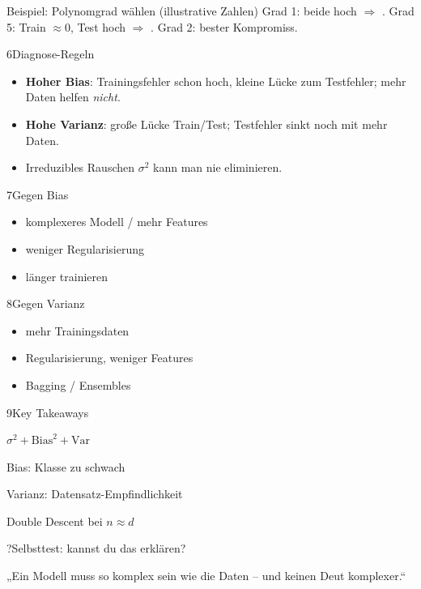 \begin{hngrid}
\begin{hnex}[raster multicolumn=3]{Beispiel: Polynomgrad wählen (illustrative Zahlen)}
Grad 1: beide hoch $\Rightarrow$ . Grad 5: Train $\approx0$, Test hoch $\Rightarrow$ . Grad 2: bester Kompromiss.
\end{hnex}
%
\begin{hnp}[raster multicolumn=3,acc=hnrose]{6}{Diagnose-Regeln}
\begin{itemize}
\item \textbf{Hoher Bias}: Trainingsfehler schon hoch, kleine Lücke zum Testfehler; mehr Daten helfen \emph{nicht}.
\item \textbf{Hohe Varianz}: große Lücke Train/Test; Testfehler sinkt noch mit mehr Daten.
\item Irreduzibles Rauschen $\sigma^2$ kann man nie eliminieren.
\end{itemize}
\end{hnp}
%
\begin{hnp}[raster multicolumn=2,acc=hnred]{7}{Gegen Bias}
\begin{itemize}
\item komplexeres Modell / mehr Features
\item weniger Regularisierung
\item länger trainieren
\end{itemize}
\end{hnp}
%
\begin{hnp}[raster multicolumn=2,acc=hngreen]{8}{Gegen Varianz}
\begin{itemize}
\item mehr Trainingsdaten
\item Regularisierung, weniger Features
\item Bagging / Ensembles
\end{itemize}
\end{hnp}
%
\begin{hnp}[raster multicolumn=2,acc=hnorange]{9}{Key Takeaways}
\begin{hnchk}
\item $\sigma^2+\mathrm{Bias}^2+\mathrm{Var}$
\item Bias: Klasse zu schwach
\item Varianz: Datensatz-Empfindlichkeit
\item Double Descent bei $n\approx d$
\end{hnchk}
\end{hnp}
%
\begin{hnp}[raster multicolumn=6,acc=hnpurple,colback=hnlilac!30]{?}{Selbsttest: kannst du das erklären?}
\end{hnp}
%
\begin{hnbanner}[raster multicolumn=6]
„Ein Modell muss so komplex sein wie die Daten -- und keinen Deut komplexer.“
\end{hnbanner}
\end{hngrid}
